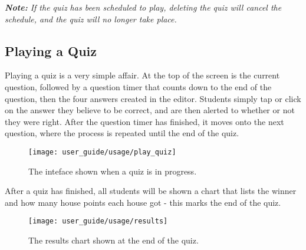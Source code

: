 \textit{\textbf{Note:} If the quiz has been scheduled to play, deleting the quiz will cancel the schedule, and the quiz will no longer take place.}

\subsection{Playing a Quiz} %
\label{sub:playing_a_quiz}
Playing a quiz is a very simple affair. At the top of the screen is the current question, followed by a question timer that counts down to the end of the question, then the four answers created in the editor. Students simply tap or click on the answer they believe to be correct, and are then alerted to whether or not they were right. After the question timer has finished, it moves onto the next question, where the process is repeated until the end of the quiz.

\begin{figure}[h!]
  \centering
  \texttt{[image: user\_guide/usage/play\_quiz]}
  \caption{The inteface shown when a quiz is in progress.}
\end{figure}

After a quiz has finished, all students will be shown a chart that lists the winner and how many house points each house got - this marks the end of the quiz.

\begin{figure}[h!]
  \centering
  \texttt{[image: user\_guide/usage/results]}
  \caption{The results chart shown at the end of the quiz.}
\end{figure}
